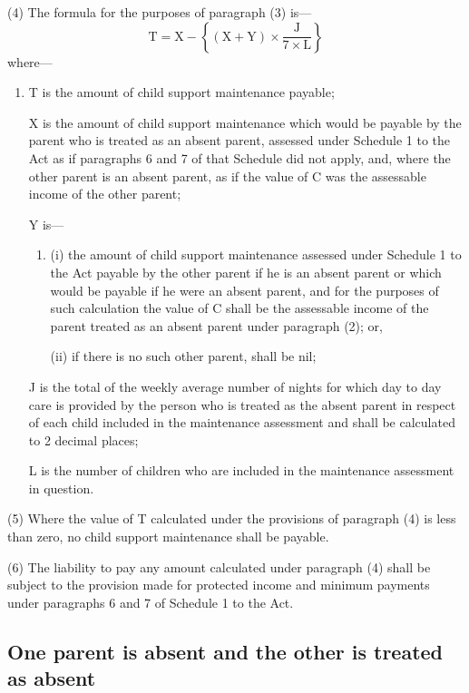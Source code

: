 \documentclass[a4paper]{article}
\begin{document}
(4) The formula for the purposes of paragraph (3) is—
\[\mathrm{T} = \mathrm{X} - \left\{ (\mathrm{X}+\mathrm{Y}) \times \frac{\mathrm{J}}{7 \times \mathrm{L}} \right\}\]
where—
\begin{enumerate}\item[]
    T is the amount of child support maintenance payable;

    X is the amount of child support maintenance which would be payable by the parent who is treated as an absent parent, assessed under Schedule 1 to the Act as if paragraphs 6 and 7 of that Schedule did not apply, and, where the other parent is an absent parent, as if the value of C was the assessable income of the other parent;

    Y is—
\begin{enumerate}\item[]
    (i)
    the amount of child support maintenance assessed under Schedule 1 to the Act payable by the other parent if he is an absent parent or which would be payable if he were an absent parent, and for the purposes of such calculation the value of C shall be the assessable income of the parent treated as an absent parent under paragraph (2); or,

    (ii)
    if there is no such other parent, shall be nil;
\end{enumerate}

    J is the total of the weekly average number of nights for which day to day care is provided by the person who is treated as the absent parent in respect of each child included in the maintenance assessment and shall be calculated to 2 decimal places;

    L is the number of children who are included in the maintenance assessment in question. 
\end{enumerate}

(5) Where the value of T calculated under the provisions of paragraph (4) is less than zero, no child support maintenance shall be payable.

(6) The liability to pay any amount calculated under paragraph (4) shall be subject to the provision made for protected income and minimum payments under paragraphs 6 and 7 of Schedule 1 to the Act.

\subsection[21. One parent is absent and the other is treated as absent]{One parent is absent and the other is treated as absent}
\end{document}
